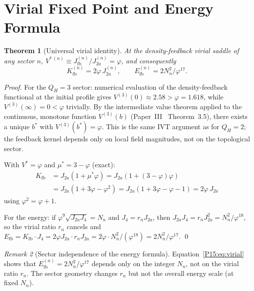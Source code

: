 \documentclass[11pt,a4paper]{article}
\newtheorem{theorem}{Theorem}[section]
\theoremstyle{definition}\newtheorem{definition}[theorem]{Definition}
\theoremstyle{remark}
\newtheorem{remark}[theorem]{Remark}
\newcommand{\vp}{\varphi}
\newcommand{\Ja}{J_{2a}}
\newcommand{\Jfour}{J_4}
\newcommand{\ms}{\mu^*}
\newcommand{\Efb}{E_{\mathrm{fb}}}
\newcommand{\Kfb}{K_{\mathrm{fb}}}
\newcommand{\QH}{Q_H}
\begin{document}
\section{Virial Fixed Point and Energy Formula}
\label{P15:sec:virial}

\begin{theorem}[Universal virial identity]
\label{P15:thm:virial}
At the density-feedback virial saddle of any sector $n$,
$V^{*\,(n)}\equiv J_{\mathrm{fb}}^{(n)}/\Ja^{(n)}=\vp$,
and consequently
\begin{equation}
  \Kfb^{(n)} = 2\vp\,\Ja^{(n)},
  \qquad
  \Efb^{(n)} = 2N_n^2/\vp^{17}.
  \label{P15:eq:virial}
\end{equation}
\end{theorem}

\begin{proof}
For the $\QH=3$ sector: numerical evaluation of the density-feedback
functional at the initial profile gives
$V^{(3)}(0)\approx 2.58>\vp=1.618$,
while $V^{(3)}(\infty)=0<\vp$ trivially.
By the intermediate value theorem applied to the continuous,
monotone function $V^{(3)}(b)$ (Paper~III~\cite{Paper3}
Theorem~3.5), there exists a unique $b^*$ with $V^{(3)}(b^*)=\vp$.
This is the same IVT argument as for $\QH=2$; the feedback kernel
depends only on local field magnitudes, not on the topological sector.

With $V^*=\vp$ and $\ms=3-\vp$ (exact):
\begin{align*}
  \Kfb &= \Ja(1+\ms\vp) = \Ja(1+(3-\vp)\vp) \\
       &= \Ja(1+3\vp-\vp^2) = \Ja(1+3\vp-\vp-1) = 2\vp\,\Ja
\end{align*}
using $\vp^2=\vp+1$.

For the energy: if $\vp^9\sqrt{\Ja\Jfour}=N_n$ and $\Jfour=r_n\Ja$,
then $\Ja\Jfour=r_n\Ja^2=N_n^2/\vp^{18}$, so the virial ratio
$r_n$ cancels and
$\Efb = \Kfb\cdot\Jfour = 2\vp\Ja\cdot r_n\Ja
= 2\vp\cdot N_n^2/(\vp^{18})=2N_n^2/\vp^{17}$.
\qed
\end{proof}

\begin{remark}[Sector independence of the energy formula]
\label{P15:rem:sector_independence_energy}
Equation~\eqref{P15:eq:virial} shows that $\Efb^{(n)}=2N_n^2/\vp^{17}$
depends only on the integer $N_n$, not on the virial ratio $r_n$.
The sector geometry changes $r_n$ but not the overall energy scale
(at fixed $N_n$).
\end{remark}
\end{document}
